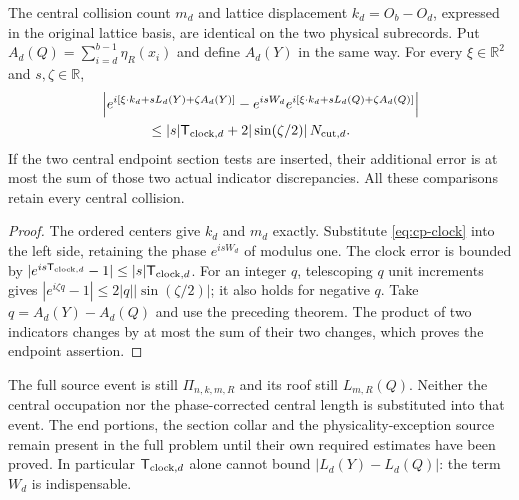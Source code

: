 \begin{proposition}
\label{prop:cp-twists}
The central collision count $m_d$ and lattice displacement
$k_d=O_b-O_d$, expressed in the original lattice basis, are identical
on the two physical subrecords.  Put
$A_d(Q)=\sum_{i=d}^{b-1}\eta_R(x_i)$ and define $A_d(Y)$ in the same
way.  For every $\xi\in\mathbb R^2$ and $s,\zeta\in\mathbb R$,
\begin{align}\label{eq:cp-exact-twist}
 &\left|e^{i[\xi\cdot k_d+sL_d(Y)+\zeta A_d(Y)]}
       -e^{isW_d}e^{i[\xi\cdot k_d+sL_d(Q)+\zeta A_d(Q)]}\right|
       \notag\\
 &\hspace{12mm}\le
 |s|\mathsf T_{{\rm clock},d}
                  +2|\sin(\zeta/2)|\,N_{{\rm cut},d}.
\end{align}
If the two central endpoint section tests are inserted, their
additional error is at most the sum of those two actual indicator
discrepancies.  All these comparisons retain every central collision.
\end{proposition}
\begin{proof}
The ordered centers give $k_d$ and $m_d$ exactly.  Substitute
\eqref{eq:cp-clock} into the left side, retaining the phase
$e^{isW_d}$ of modulus one.  The clock error is bounded by
$|e^{is\mathsf T_{{\rm clock},d}}-1|\le
 |s|\mathsf T_{{\rm clock},d}$.  For an integer $q$, telescoping
$q$ unit increments gives
$|e^{i\zeta q}-1|\le2|q||\sin(\zeta/2)|$; it also holds for
negative $q$.  Take $q=A_d(Y)-A_d(Q)$ and use the preceding
theorem.  The product of two indicators changes by at most the sum
of their two changes, which proves the endpoint assertion.
\end{proof}

\begin{remark}\label{rem:cp-full-event}
The full source event is still $\Pi_{n,k,m,R}$ and its roof still
$L_{m,R}(Q)$.  Neither the central occupation nor the phase-corrected
central length is substituted into that event.  The end portions,
the section collar and the physicality-exception source remain
present in the full problem until their own required estimates have
been proved.  In particular $\mathsf T_{{\rm clock},d}$ alone
cannot bound $|L_d(Y)-L_d(Q)|$: the term $W_d$ is indispensable.
\end{remark}
